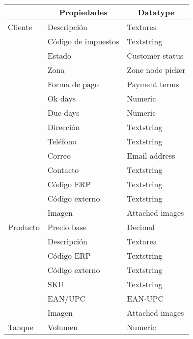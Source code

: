 \begin{longtable}{ | p{5em} | l | l | }
    \hline
    \rowcolor{gray!30}
    \multicolumn{1}{|c|}{Doctype} &
    \multicolumn{1}{|c|}{Propiedades} &
    \multicolumn{1}{|c|}{Datatype} \\
    \hline
    \endhead

    \hline
    \endfoot

    \endlastfoot

    Cliente
        & Descripción & Textarea \\
        \cline{2-3}
        & Código de impuestos & Textstring \\
        \cline{2-3}
        & Estado & Customer status \\
        \cline{2-3}
        & Zona & Zone node picker \\
        \cline{2-3}
        & Forma de pago & Payment terms \\
        \cline{2-3}
        & Ok days & Numeric \\
        \cline{2-3}
        & Due days & Numeric \\
        \cline{2-3}
        & Dirección & Textstring \\
        \cline{2-3}
        & Teléfono & Textstring \\
        \cline{2-3}
        & Correo & Email address \\
        \cline{2-3}
        & Contacto & Textstring \\
        \cline{2-3}
        & Código ERP & Textstring \\
        \cline{2-3}
        & Código externo & Textstring \\
        \cline{2-3}
        & Imagen & Attached images \\
    \hline

    Producto
        & Precio base & Decimal \\
        \cline{2-3}
        & Descripción & Textarea \\
        \cline{2-3}
        & Código ERP & Textstring \\
        \cline{2-3}
        & Código externo & Textstring \\
        \cline{2-3}
        & SKU & Textstring \\
        \cline{2-3}
        & EAN/UPC & EAN-UPC \\
        \cline{2-3}
        & Imagen & Attached images \\
    \hline

    Tanque
        & Volumen & Numeric \\
    \hline


\end{longtable}
